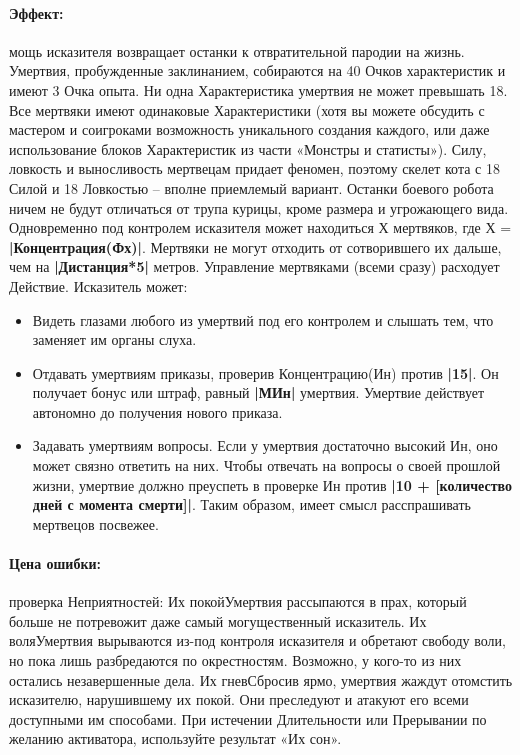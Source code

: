 \paragraph{Эффект: }мощь исказителя возвращает останки к отвратительной пародии на жизнь. Умертвия, пробужденные заклинанием, собираются на 40 Очков характеристик и имеют 3 Очка опыта. Ни одна Характеристика умертвия не может превышать 18. Все мертвяки имеют одинаковые Характеристики (хотя вы можете обсудить с мастером и соигроками возможность уникального создания каждого, или даже использование блоков Характеристик из части «Монстры и статисты»). Силу, ловкость и выносливость мертвецам придает феномен, поэтому скелет кота с 18 Силой и 18 Ловкостью – вполне приемлемый вариант. Останки боевого робота ничем не будут отличаться от трупа курицы, кроме размера и угрожающего вида. 
\newline Одновременно под контролем исказителя может находиться Х мертвяков, где Х = 
\textbf{|Концентрация(Фх)|}. Мертвяки не могут отходить от сотворившего их дальше, чем на 
\textbf{|Дистанция*5|} метров. 
\newline Управление мертвяками (всеми сразу) расходует Действие. Исказитель может: 
\begin{itemize} 
\item Видеть глазами любого из умертвий под его контролем и слышать тем, что заменяет им органы слуха. 
\item Отдавать умертвиям приказы, проверив Концентрацию(Ин) против 
\textbf{|15|}. Он получает бонус или штраф, равный 
\textbf{|МИн|} умертвия. Умертвие действует автономно до получения нового приказа. 
\item Задавать умертвиям вопросы. Если у умертвия достаточно высокий Ин, оно может связно ответить на них. Чтобы отвечать на вопросы о своей прошлой жизни, умертвие должно преуспеть в проверке Ин против 
\textbf{|10 + [количество дней с момента смерти]|}. Таким образом, имеет смысл расспрашивать мертвецов посвежее. 
\end{itemize} 
\paragraph{Цена ошибки: }проверка Неприятностей: 
 {Их покой}{Умертвия рассыпаются в прах, который больше не потревожит даже самый могущественный исказитель.} {Их воля}{Умертвия вырываются из-под контроля исказителя и обретают свободу воли, но пока лишь разбредаются по окрестностям. Возможно, у кого-то из них остались незавершенные дела.} {Их гнев}{Сбросив ярмо, умертвия жаждут отомстить исказителю, нарушившему их покой. Они преследуют и атакуют его всеми доступными им способами. 
\newline При истечении Длительности или Прерывании по желанию активатора, используйте результат «Их сон».}
